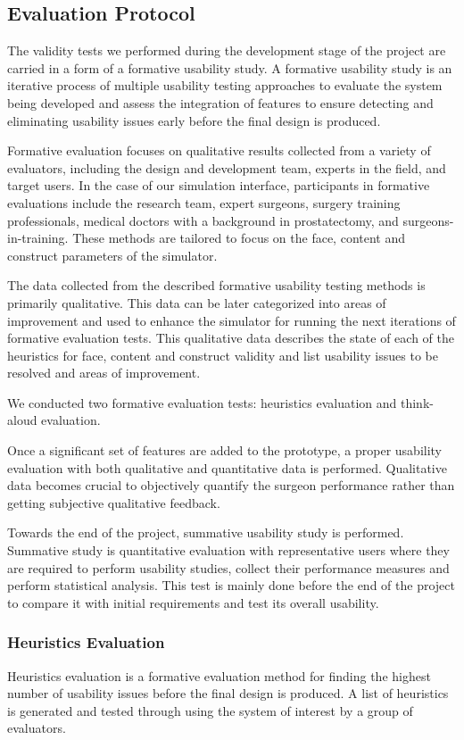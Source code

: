 \subsection{Evaluation Protocol}

The validity tests we performed during the development stage of the project are carried in a form of a formative usability study. A formative usability study is an iterative process of multiple usability testing approaches to evaluate the system being developed and assess the integration of features to ensure detecting and eliminating usability issues early before the final design is produced.

Formative evaluation focuses on qualitative results collected from a variety of evaluators, including the design and development team, experts in the field, and target users. In the case of our simulation interface, participants in formative evaluations include the research team, expert surgeons, surgery training professionals, medical doctors with a background in prostatectomy, and surgeons-in-training. These methods are tailored to focus on the face, content and construct parameters of the simulator.

The data collected from the described formative usability testing methods is primarily qualitative.  This data can be later categorized into areas of improvement and used to enhance the simulator for running the next iterations of formative evaluation tests. This qualitative data describes the state of each of the heuristics for face, content and construct validity and list usability issues to be resolved and areas of improvement.

We conducted two formative evaluation tests: heuristics evaluation and think-aloud evaluation.

Once a significant set of features are added to the prototype, a proper usability evaluation with both qualitative and quantitative data is performed. Qualitative data becomes crucial to objectively quantify the surgeon performance rather than getting subjective qualitative feedback.


Towards the end of the project, summative usability study is performed. Summative study is quantitative evaluation with representative users where they are required to perform usability studies, collect their performance measures and perform statistical analysis. This test is mainly done before the end of the project to compare it with initial requirements and test its overall usability.

\subsubsection{Heuristics Evaluation}
Heuristics evaluation is a formative evaluation method for finding the highest number of usability issues before the final design is produced. A list of heuristics is generated and tested through using the system of interest by a group of evaluators.

